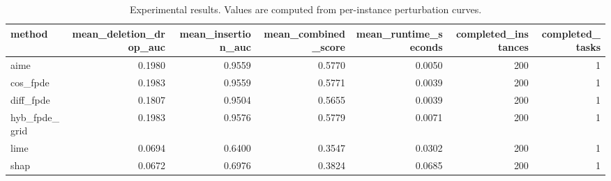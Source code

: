 \begin{table}[t]
\caption{Experimental results. Values are computed from per-instance perturbation curves.}
\label{tab:main_results_computed}
\centering
\begin{tabular}{lrrrrrr}
\toprule
method & mean\_deletion\_drop\_auc & mean\_insertion\_auc & mean\_combined\_score & mean\_runtime\_seconds & completed\_instances & completed\_tasks \\
\midrule
aime & 0.1980 & 0.9559 & 0.5770 & 0.0050 & 200 & 1 \\
cos\_fpde & 0.1983 & 0.9559 & 0.5771 & 0.0039 & 200 & 1 \\
diff\_fpde & 0.1807 & 0.9504 & 0.5655 & 0.0039 & 200 & 1 \\
hyb\_fpde\_grid & 0.1983 & 0.9576 & 0.5779 & 0.0071 & 200 & 1 \\
lime & 0.0694 & 0.6400 & 0.3547 & 0.0302 & 200 & 1 \\
shap & 0.0672 & 0.6976 & 0.3824 & 0.0685 & 200 & 1 \\
\bottomrule
\end{tabular}

\end{table}
